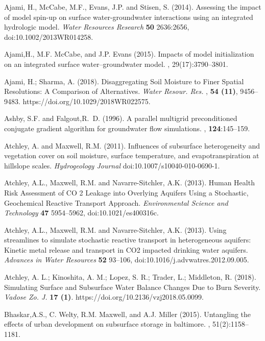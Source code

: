 \begin{thebibliography}{999}

Ajami, H., McCabe, M.F., Evans, J.P. and Stisen, S. (2014). Assessing the impact of model spin-up on surface water-groundwater interactions using an integrated hydrologic model. {\em Water Resources Research} {\bf 50} 2636:2656, doi:10.1002/2013WR014258.


Ajami,H., M.F. McCabe, and J.P. Evans (2015).
\newblock Impacts of model initialization on an integrated surface water--groundwater model.
, 29(17):3790--3801.

Ajami, H.; Sharma, A. (2018). Disaggregating Soil Moisture to Finer Spatial Resolutions: A Comparison of Alternatives. {\em Water Resour. Res.} , {\bf 54 (11)}, 9456–9483. https://doi.org/10.1029/2018WR022575.

Ashby, S.F. and Falgout,R.~D. (1996).
\newblock A parallel multigrid preconditioned conjugate gradient algorithm for
  groundwater flow simulations.
, {\bf 124}:145--159.

Atchley, A. and Maxwell, R.M. (2011). Influences of subsurface heterogeneity and vegetation cover on soil moisture, surface temperature, and evapotranspiration at hillslope scales. {\em Hydrogeology Journal} doi:10.1007/s10040-010-0690-1.

Atchley, A.L., Maxwell, R.M. and Navarre-Sitchler, A.K. (2013). Human Health Risk Assessment of CO 2 Leakage into Overlying Aquifers Using a Stochastic, Geochemical Reactive Transport Approach. {\em Environmental Science and Technology} {\bf 47} 5954--5962, doi:10.1021/es400316c.

Atchley, A.L., Maxwell, R.M. and Navarre-Sitchler, A.K. (2013). Using streamlines to simulate stochastic reactive transport in heterogeneous aquifers: Kinetic metal release and transport in CO2 impacted drinking water aquifers. {\em Advances in Water Resources} {\bf 52} 93--106, doi:10.1016/j.advwatres.2012.09.005.

Atchley, A. L.; Kinoshita, A. M.; Lopez, S. R.; Trader, L.; Middleton, R. (2018). Simulating Surface and Subsurface Water Balance Changes Due to Burn Severity. {\em Vadose Zo. J.} {\bf 17 (1)}. https://doi.org/10.2136/vzj2018.05.0099.

Bhaskar,A.S., C. Welty, R.M. Maxwell, and A.J. Miller (2015).
\newblock Untangling the effects of urban development on subsurface storage in
  baltimore.
, 51(2):1158--1181.


\end{thebibliography}
